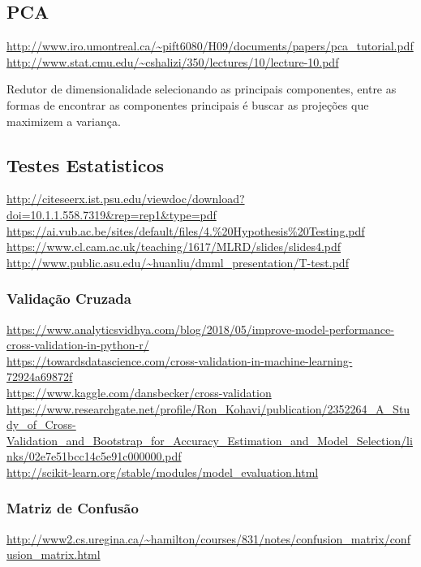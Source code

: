 \documentclass[12pt]{article}
\begin{document}
\subsection{PCA}

\url{http://www.iro.umontreal.ca/~pift6080/H09/documents/papers/pca_tutorial.pdf}\\
\url{http://www.stat.cmu.edu/~cshalizi/350/lectures/10/lecture-10.pdf}

	Redutor de dimensionalidade selecionando as principais componentes, entre as formas de encontrar as componentes principais é buscar as projeções que maximizem a variança.
	
\subsection{Testes Estatisticos}

	\url{http://citeseerx.ist.psu.edu/viewdoc/download?doi=10.1.1.558.7319&rep=rep1&type=pdf}\\
	\url{https://ai.vub.ac.be/sites/default/files/4.\%20Hypothesis\%20Testing.pdf}\\
	\url{https://www.cl.cam.ac.uk/teaching/1617/MLRD/slides/slides4.pdf}\\
	\url{http://www.public.asu.edu/~huanliu/dmml_presentation/T-test.pdf}

	\subsubsection{Validação Cruzada}
	
		\url{https://www.analyticsvidhya.com/blog/2018/05/improve-model-performance-cross-validation-in-python-r/}\\
		\url{https://towardsdatascience.com/cross-validation-in-machine-learning-72924a69872f}\\
		\url{https://www.kaggle.com/dansbecker/cross-validation}\\
		\url{https://www.researchgate.net/profile/Ron_Kohavi/publication/2352264_A_Study_of_Cross-Validation_and_Bootstrap_for_Accuracy_Estimation_and_Model_Selection/links/02e7e51bcc14c5e91c000000.pdf}\\
		\url{http://scikit-learn.org/stable/modules/model_evaluation.html}
		
	\subsubsection{Matriz de Confusão}
	
		\url{http://www2.cs.uregina.ca/~hamilton/courses/831/notes/confusion_matrix/confusion_matrix.html}\\
		
\end{document}
